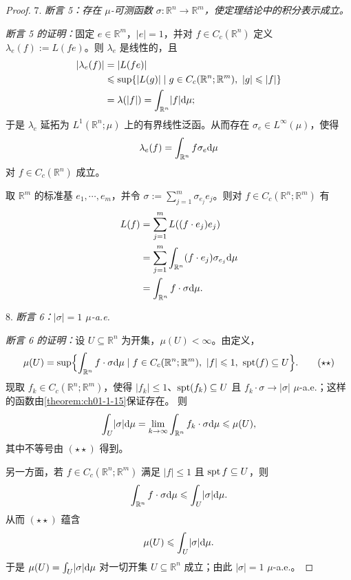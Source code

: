 \documentclass[../../main.tex]{subfiles}%
\begin{document}
\begin{proof}
7. \emph{断言 5：存在 $\mu$-可测函数 $\sigma:\mathbb{R}^n\to\mathbb{R}^m$，使定理结论中的积分表示成立。}

\emph{断言 5 的证明：}固定 $e\in\mathbb{R}^m$，$\lvert e\rvert=1$，并对 $f\in C_c(\mathbb{R}^n)$ 定义 $\lambda_e(f):=L(fe)$。则 $\lambda_e$ 是线性的，且
\begin{align*}
\lvert\lambda_e(f)\rvert&=\lvert L(fe)\rvert\\
&\leqslant\sup\{\lvert L(g)\rvert\mid g\in C_c(\mathbb{R}^n;\mathbb{R}^m),\ \lvert g\rvert\leqslant\lvert f\rvert\}\\
&=\lambda(\lvert f\rvert)=\int_{\mathbb{R}^n}\lvert f\rvert\mathrm{d}\mu;
\end{align*}
于是 $\lambda_e$ 延拓为 $L^1(\mathbb{R}^n;\mu)$ 上的有界线性泛函。从而存在 $\sigma_e\in L^{\infty}(\mu)$，使得
\begin{align*}
\lambda_e(f)=\int_{\mathbb{R}^n}f\sigma_e\mathrm{d}\mu
\end{align*}
对 $f\in C_c(\mathbb{R}^n)$ 成立。

取 $\mathbb{R}^m$ 的标准基 $e_1,\cdots,e_m$，并令 $\sigma:=\sum_{j=1}^{m}\sigma_{e_j}e_j$。则对 $f\in C_c(\mathbb{R}^n;\mathbb{R}^m)$ 有
\begin{align*}
L(f)&=\sum_{j=1}^{m}L((f\cdot e_j)e_j)\\
&=\sum_{j=1}^{m}\int_{\mathbb{R}^n}(f\cdot e_j)\sigma_{e_j}\mathrm{d}\mu\\
&=\int_{\mathbb{R}^n}f\cdot\sigma\mathrm{d}\mu.
\end{align*}

8. \emph{断言 6：$\lvert\sigma\rvert=1$ $\mu$-a.e.}

\emph{断言 6 的证明：}设 $U\subseteq\mathbb{R}^n$ 为开集，$\mu(U)<\infty$。由定义，
\begin{align*}
\mu(U)=\sup\Bigl\{\int_{\mathbb{R}^n}f\cdot\sigma\diff\mu\mid f\in C_c(\mathbb{R}^n;\mathbb{R}^m),\ \lvert f\rvert\leqslant1,\ \spt(f)\subseteq U\Bigr\}. \qquad(\star\star)
\end{align*}
现取 $f_k\in C_c(\mathbb{R}^n;\mathbb{R}^m)$，使得 $\lvert f_k\rvert\leqslant1$、$\operatorname{spt}(f_k)\subseteq U$ 且 $f_k\cdot\sigma\to\lvert\sigma\rvert$ $\mu$-a.e.；这样的函数由\cref{theorem:ch01-1-15}保证存在。%
则
\begin{align*}
\int_{U}\lvert\sigma\rvert\mathrm{d}\mu=\lim_{k\to\infty}\int_{\mathbb{R}^n}f_k\cdot\sigma\mathrm{d}\mu\leqslant\mu(U),
\end{align*}
其中不等号由 $(\star\star)$ 得到。

另一方面，若 $f\in C_c(\mathbb{R}^n;\mathbb{R}^m)$ 满足 $\lvert f\rvert\leqslant1$ 且 $\operatorname{spt} f\subseteq U$，则
\begin{align*}
\int_{\mathbb{R}^n}f\cdot\sigma\mathrm{d}\mu\leqslant\int_{U}\lvert\sigma\rvert\mathrm{d}\mu.
\end{align*}
从而 $(\star\star)$ 蕴含
\begin{align*}
\mu(U)\leqslant\int_{U}\lvert\sigma\rvert\mathrm{d}\mu.
\end{align*}
于是 $\mu(U)=\int_{U}\lvert\sigma\rvert\mathrm{d}\mu$ 对一切开集 $U\subseteq\mathbb{R}^n$ 成立；由此 $\lvert\sigma\rvert=1$ $\mu$-a.e.。
\end{proof}
\end{document}
